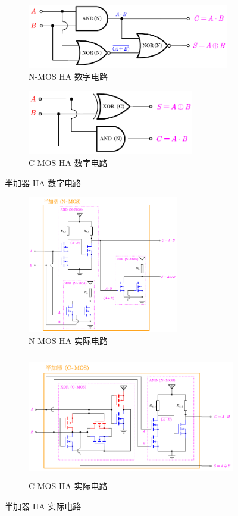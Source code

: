 \documentclass[UTF8]{report}
\theoremstyle{MyLineTheoremStyle} %
\theoremstyle{MyBlockTheoremStyle} %
\theoremstyle{MySubsubsectionStyle} %
\begin{document}
\begin{figure}[H]\centering
\begin{subfigure}[t]{0.5\columnwidth}\centering
    \includegraphics[height=80pt]{assets/2/NMOS 半加器数字电路.pdf}
    \caption{ N-MOS HA 数字电路}
\end{subfigure}\hfill
\begin{subfigure}[t]{0.5\columnwidth}\centering
    \includegraphics[height=80pt]{assets/2/CMOS 半加器数字电路.pdf}
    \caption{ C-MOS HA 数字电路 }
\end{subfigure}
\caption{ 半加器 HA 数字电路 }\label{半加器 HA 数字电路}
\end{figure}

\begin{figure}[H]\centering
\begin{subfigure}[t]{0.42\columnwidth}\centering
    \includegraphics[height=170pt]{assets/2/NMOS 半加器实际电路.pdf}
    \caption{ N-MOS HA 实际电路 }
\end{subfigure}\hfill
\begin{subfigure}[t]{0.58\columnwidth}\centering
    \includegraphics[height=155pt]{assets/2/CMOS 半加器实际电路.pdf}
    \caption{ C-MOS HA 实际电路 }
\end{subfigure}
\caption{ 半加器 HA 实际电路 }\label{半加器 HA 实际电路}
\end{figure}
\end{document}
